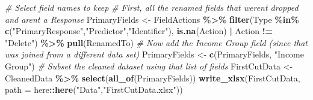 \documentclass[
]{article}
\newenvironment{Shaded}{\begin{snugshade}}{\end{snugshade}}
\newcommand{\AttributeTok}[1]{\textcolor[rgb]{0.13,0.29,0.53}{#1}}
\newcommand{\CommentTok}[1]{\textcolor[rgb]{0.56,0.35,0.01}{\textit{#1}}}
\newcommand{\FunctionTok}[1]{\textcolor[rgb]{0.13,0.29,0.53}{\textbf{#1}}}
\newcommand{\NormalTok}[1]{#1}
\newcommand{\OtherTok}[1]{\textcolor[rgb]{0.56,0.35,0.01}{#1}}
\newcommand{\SpecialCharTok}[1]{\textcolor[rgb]{0.81,0.36,0.00}{\textbf{#1}}}
\newcommand{\StringTok}[1]{\textcolor[rgb]{0.31,0.60,0.02}{#1}}
\begin{document}
\begin{Shaded}
\begin{Highlighting}[]
\CommentTok{\# Select field names to keep}
\CommentTok{\# First, all the renamed fields that weren\textquotesingle{}t dropped and aren\textquotesingle{}t a Response}
\NormalTok{PrimaryFields }\OtherTok{\textless{}{-}}\NormalTok{ FieldActions }\SpecialCharTok{\%\textgreater{}\%}
  \FunctionTok{filter}\NormalTok{(Type }\SpecialCharTok{\%in\%} \FunctionTok{c}\NormalTok{(}\StringTok{"PrimaryResponse"}\NormalTok{,}\StringTok{"Predictor"}\NormalTok{,}\StringTok{"Identifier"}\NormalTok{),}
         \FunctionTok{is.na}\NormalTok{(Action) }\SpecialCharTok{|}\NormalTok{ Action }\SpecialCharTok{!=} \StringTok{"Delete"}\NormalTok{) }\SpecialCharTok{\%\textgreater{}\%}
  \FunctionTok{pull}\NormalTok{(RenamedTo)}
\CommentTok{\# Now add the Income Group field (since that was joined from a different data set)}
\NormalTok{PrimaryFields }\OtherTok{\textless{}{-}} \FunctionTok{c}\NormalTok{(PrimaryFields, }\StringTok{"Income Group"}\NormalTok{)}
\CommentTok{\# Subset the cleaned dataset using that list of fields}
\NormalTok{FirstCutData }\OtherTok{\textless{}{-}}\NormalTok{ CleanedData }\SpecialCharTok{\%\textgreater{}\%}
  \FunctionTok{select}\NormalTok{(}\FunctionTok{all\_of}\NormalTok{(PrimaryFields))}
\FunctionTok{write\_xlsx}\NormalTok{(FirstCutData, }\AttributeTok{path =}\NormalTok{ here}\SpecialCharTok{::}\FunctionTok{here}\NormalTok{(}\StringTok{"Data"}\NormalTok{,}\StringTok{"FirstCutData.xlsx"}\NormalTok{))}
\end{Highlighting}
\end{Shaded}
\end{document}

